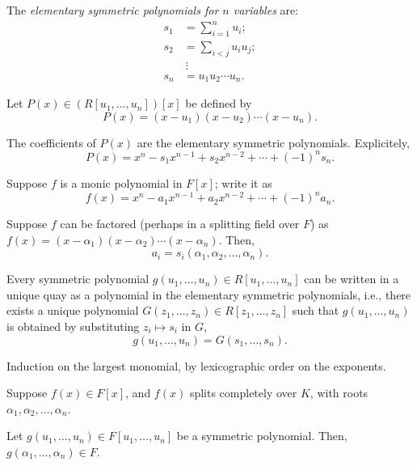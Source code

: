 \begin{defn}
	The \emph{elementary symmetric polynomials for $n$ variables} are:
	\begin{align*}
		s_1 &= \sum^{n}_{i=1} u_i;\\
		s_2 &= \sum_{i < j} u_iu_j;\\
		&\ \vdots\\
		s_n &= u_1 u_2 \cdots u_n.
	\end{align*}
\end{defn}

Let $P(x) \in \left( R[u_1, \dots, u_n] \right)[x] $ be defined by \[
	P(x) = (x-u_1)(x-u_2)\cdots(x-u_n).
\]

The coefficients of $P(x)$ are the elementary symmetric polynomials. Explicitely, \[
	P(x) = x^n - s_1x^{n-1} + s_2x^{n-2} + \cdots + (-1)^n s_n.
\]

\begin{lem}\label{l37:lem7}
Suppose $f$ is a monic polynomial in $F[x]$; write it as  \[
	f(x) = x^n - a_1 x^{n-1} + a_2 x^{n-2} + \cdots + (-1)^n a_n.
\]

Suppose $f$ can be factored (perhaps in a splitting field over $F$) as $f(x) = (x - \alpha_1)(x - \alpha_2)\cdots(x - \alpha_n)$. Then, \[
	a_i = s_i(\alpha_1, \alpha_2, \dots, \alpha_n).
\]
\end{lem}

\begin{thm}
	Every symmetric polynomial $g(u_1, \dots, u_n) \in R[u_1, \dots, u_n]$ can be written in a unique quay as a polynomial in the elementary symmetric polynomials, i.e., there exists a unique polynomial $G(z_1, \dots, z_n) \in R[z_1, \dots, z_n]$ such that $g(u_1, \dots, u_n)$ is obtained by substituting $z_i \mapsto s_i$ in $G$,  \[
		g(u_1, \dots, u_n) = G(s_1, \dots, s_n).
	\]
\end{thm}

\begin{sk}
	Induction on the largest monomial, by lexicographic order on the exponents.
\end{sk}

\begin{cor}\label{l37:cor9}
	Suppose $f(x) \in F[x]$, and $f(x)$ splits completely over $K$, with roots $\alpha_1, \alpha_2, \dots, \alpha_n$.

	Let $g(u_1, \dots, u_n) \in F[u_1, \dots, u_n]$ be a symmetric polynomial. Then, $g(\alpha_1, \dots, \alpha_n) \in F$.
\end{cor}

